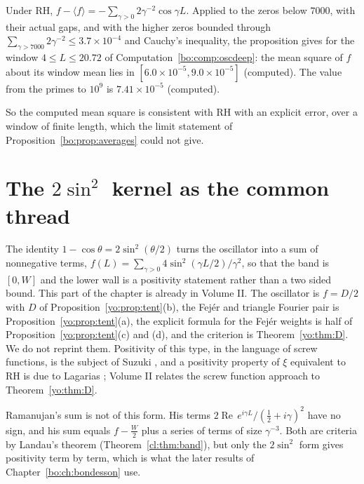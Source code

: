 \begin{computation}\label{cl:comp:window}
Under RH, $f-\langle f\rangle=-\sum_{\gamma>0}2\gamma^{-2}\cos\gamma L$. Applied to the zeros below $7000$, with their actual gaps, and with the higher zeros bounded through $\sum_{\gamma>7000}2\gamma^{-2}\le3.7\times10^{-4}$ and Cauchy's inequality, the proposition gives for the window $4\le L\le20.72$ of Computation~\ref{bo:comp:oscdeep}: the mean square of $f$ about its window mean lies in $[6.0\times10^{-5},9.0\times10^{-5}]$ (computed). The value from the primes to $10^9$ is $7.41\times10^{-5}$ (computed).
\end{computation}

So the computed mean square is consistent with RH with an explicit error, over a window of finite length, which the limit statement of Proposition~\ref{bo:prop:averages} could not give.

\section{The $2\sin^2$ kernel as the common thread}\label{cl:sec:sin2}

The identity $1-\cos\theta=2\sin^2(\theta/2)$ turns the oscillator into a sum of nonnegative terms, $f(L)=\sum_{\gamma>0}4\sin^2(\gamma L/2)/\gamma^2$, so that the band is $[0,W]$ and the lower wall is a positivity statement rather than a two sided bound. This part of the chapter is already in Volume II. The oscillator is $f=D/2$ with $D$ of Proposition~\ref{yo:prop:tent}(b), the Fej\'er and triangle Fourier pair is Proposition~\ref{yo:prop:tent}(a), the explicit formula for the Fej\'er weights is half of Proposition~\ref{yo:prop:tent}(c) and (d), and the criterion is Theorem~\ref{yo:thm:D}. We do not reprint them. Positivity of this type, in the language of screw functions, is the subject of Suzuki \cite{Suzuki22}, and a positivity property of $\xi$ equivalent to RH is due to Lagarias \cite{Lagarias}; Volume II relates the screw function approach to Theorem~\ref{yo:thm:D}. %

Ramanujan's sum is not of this form. His terms $2\operatorname{Re}\,e^{i\gamma L}/(\frac12+i\gamma)^2$ have no sign, and his sum equals $f-\frac W2$ plus a series of terms of size $\gamma^{-3}$. Both are criteria by Landau's theorem (Theorem~\ref{cl:thm:band}), but only the $2\sin^2$ form gives positivity term by term, which is what the later results of Chapter~\ref{bo:ch:bondesson} use.

